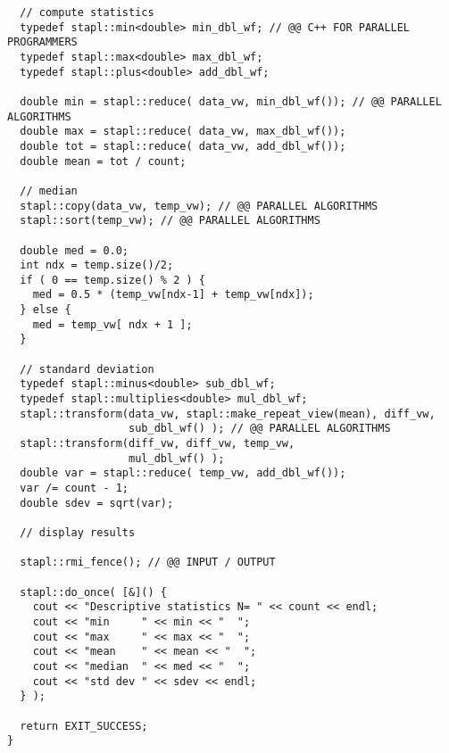\begin{verbatim}
  // compute statistics
  typedef stapl::min<double> min_dbl_wf; // @@ C++ FOR PARALLEL PROGRAMMERS
  typedef stapl::max<double> max_dbl_wf;
  typedef stapl::plus<double> add_dbl_wf;

  double min = stapl::reduce( data_vw, min_dbl_wf()); // @@ PARALLEL ALGORITHMS
  double max = stapl::reduce( data_vw, max_dbl_wf());
  double tot = stapl::reduce( data_vw, add_dbl_wf());
  double mean = tot / count;

  // median
  stapl::copy(data_vw, temp_vw); // @@ PARALLEL ALGORITHMS
  stapl::sort(temp_vw); // @@ PARALLEL ALGORITHMS

  double med = 0.0;
  int ndx = temp.size()/2;
  if ( 0 == temp.size() % 2 ) {
    med = 0.5 * (temp_vw[ndx-1] + temp_vw[ndx]);
  } else {
    med = temp_vw[ ndx + 1 ];
  }

  // standard deviation
  typedef stapl::minus<double> sub_dbl_wf;
  typedef stapl::multiplies<double> mul_dbl_wf;
  stapl::transform(data_vw, stapl::make_repeat_view(mean), diff_vw,
                   sub_dbl_wf() ); // @@ PARALLEL ALGORITHMS
  stapl::transform(diff_vw, diff_vw, temp_vw,
                   mul_dbl_wf() );
  double var = stapl::reduce( temp_vw, add_dbl_wf());
  var /= count - 1;
  double sdev = sqrt(var);

  // display results

  stapl::rmi_fence(); // @@ INPUT / OUTPUT

  stapl::do_once( [&]() {
    cout << "Descriptive statistics N= " << count << endl;
    cout << "min     " << min << "  ";
    cout << "max     " << max << "  ";
    cout << "mean    " << mean << "  ";
    cout << "median  " << med << "  ";
    cout << "std dev " << sdev << endl;
  } );

  return EXIT_SUCCESS;
}
\end{verbatim}
\normalsize
